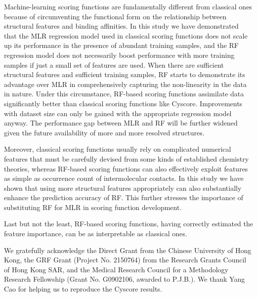 \documentclass[journal=jacsat,manuscript=article]{achemso}
\begin{document}
Machine-learning scoring functions are fundamentally different from classical ones because of circumventing the functional form on the relationship between structural features and binding affinities. In this study we have demonstrated that the MLR regression model used in classical scoring functions does not scale up its performance in the presence of abundant training samples, and the RF regression model does not necessarily boost performance with more training samples if just a small set of features are used. When there are sufficient structural features and sufficient training samples, RF starts to demonstrate its advantage over MLR in comprehensively capturing the non-linearity in the data in nature. Under this circumstance, RF-based scoring functions assimilate data significantly better than classical scoring functions like Cyscore. Improvements with dataset size can only be gained with the appropriate regression model anyway. The performance gap between MLR and RF will be further widened given the future availability of more and more resolved structures.

Moreover, classical scoring functions usually rely on complicated numerical features that must be carefully devised from some kinds of established chemistry theories, whereas RF-based scoring functions can also effectively exploit features as simple as occurrence count of intermolecular contacts. In this study we have shown that using more structural features appropriately can also substantially enhance the prediction accuracy of RF. This further stresses the importance of substituting RF for MLR in scoring function development.

Last but not the least, RF-based scoring functions, having correctly estimated the feature importance, can be as interpretable as classical ones.

\begin{acknowledgement}

We gratefully acknowledge the Direct Grant from the Chinese University of Hong Kong, the GRF Grant (Project No. 2150764) from the Research Grants Council of Hong Kong SAR, and the Medical Research Council for a Methodology Research Fellowship (Grant No. G0902106, awarded to P.J.B.). We thank Yang Cao for helping us to reproduce the Cyscore results.

\end{acknowledgement}
\end{document}
